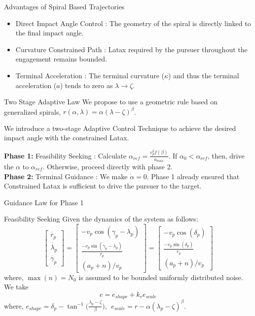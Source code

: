 \begin{frame}
		\begin{block}{Advantages of Spiral Based Trajectories}
		\begin{itemize}
			\item Direct Impact Angle Control : The geometry of the spiral is directly linked to the final impact angle.
			\item Curvature Constrained Path : Latax required by the pursuer throughout the engagement remains bounded.
			\item Terminal Acceleration : The terminal curvature ($\kappa$) and thus the terminal acceleration ($a$) tends to zero as $\lambda \rightarrow \zeta$.  
		\end{itemize}
	\end{block}
	\begin{myblock}{Two Stage Adaptive Law}
		We propose to use a geometric rule based on generalized spirals, $r(\alpha,\lambda) = \alpha (\lambda - \zeta)^\beta$.
		
		We introduce a two-stage Adaptive Control Technique to achieve the desired impact angle with the constrained Latax. 
		
		\textbf{Phase 1:} Feasibility Seeking : Calculate $\alpha_{ref} = \frac{v_p^2f(\beta)}{a_{max}}$. If $\alpha_0 < \alpha_{ref}$, then, drive the $\alpha$ to $\alpha_{ref}$. Otherwise, proceed directly with phase 2.\\
		\vspace{0.2cm}
		\textbf{Phase 2:} Terminal Guidance : We make $\dot{\alpha}=0$. Phase 1 already ensured that Constrained Latax is sufficient to drive the pursuer to the target.
	\end{myblock}
\end{frame}
\begin{frame}{Guidance Law for Phase 1}
\begin{myblock}{Feasibility Seeking}
	Given the dynamics of the system as follows:
	$$\begin{bmatrix}
		\dot{r_p} \\ 
		\dot{\lambda_p} \\
		\dot{\gamma_p}
	\end{bmatrix}=\begin{bmatrix}
	-v_p \cos(\gamma_p-\lambda_p) \\ 
	\frac{-v_p \sin(\gamma_p-\lambda_p)}{r_p} \\
	(a_p+n)/v_p
	\end{bmatrix}=\begin{bmatrix}
	-v_p \cos(\delta_p) \\ 
	\frac{-v_p \sin(\delta_p)}{r_p} \\
	(a_p+n)/v_p
	\end{bmatrix}$$
	where, $\max(n)=N_0$ is assumed to be bounded uniformly distributed noise. We take \\
	$$e=e_{shape}+k_re_{scale}$$
	where, $e_{shape}=\delta_p-\tan^{-1}{(\frac{\lambda_p-\zeta}{\beta}}), ~~ e_{scale}= r-\alpha(\lambda_p-\zeta)^{\beta}$.
\end{myblock}
\end{frame}
